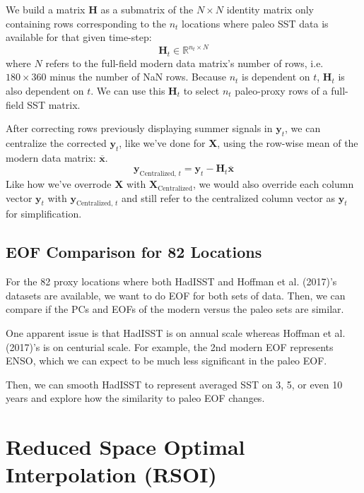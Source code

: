 \documentclass{article}
\begin{document}
We build a matrix \textbf{H} as a submatrix of the $N \times N$ identity matrix only containing rows corresponding to the $n_t$ locations where paleo SST data is available for that given time-step:
$$\textbf{H}_t \in \mathbb{R}^{n_t \times N}$$
where $N$ refers to the full-field modern data matrix's number of rows, i.e. $180 \times 360$ minus the number of NaN rows. Because $n_t$ is dependent on $t$, $\textbf{H}_t$ is also dependent on $t$. We can use this $\textbf{H}_t$ to select $n_t$ paleo-proxy rows of a full-field SST matrix.

After correcting rows previously displaying summer signals in $\textbf{y}_t$, we can centralize the corrected $\textbf{y}_t$, like we've done for \textbf{X},  using the row-wise mean of the modern data matrix: $\overline{\textbf{x}}$. 
$$\textbf{y}_{\text{Centralized, }t} = \textbf{y}_t - \textbf{H}_t \overline{\textbf{x}}$$
Like how we've overrode \textbf{X} with $\textbf{X}_{\text{Centralized}}$, we would also override each column vector $\textbf{y}_t$ with $\textbf{y}_{\text{Centralized, }t}$ and still refer to the centralized column vector as $\textbf{y}_t$ for simplification.

\subsection{EOF Comparison for 82 Locations}

For the 82 proxy locations where both HadISST and Hoffman et al. (2017)'s datasets are available, we want to do EOF for both sets of data. Then, we can compare if the PCs and EOFs of the modern versus the paleo sets are similar.

One apparent issue is that HadISST is on annual scale whereas Hoffman et al. (2017)'s is on centurial scale. For example, the 2nd modern EOF represents ENSO, which we can expect to be much less significant in the paleo EOF.

Then, we can smooth HadISST to represent averaged SST on 3, 5, or even 10 years and explore how the similarity to paleo EOF changes.

\section{Reduced Space Optimal Interpolation (RSOI)}
\end{document}
